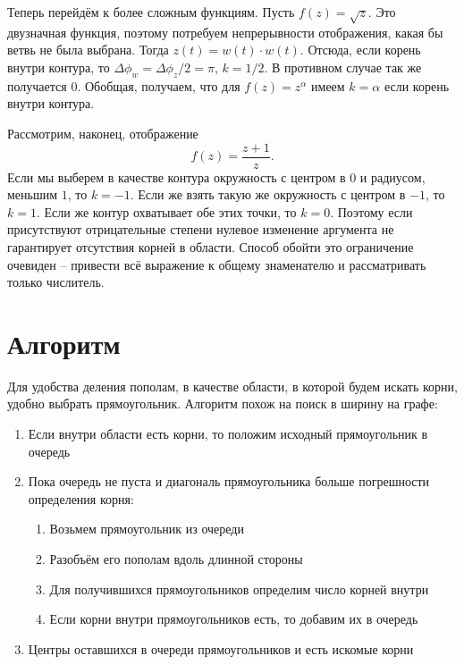 Теперь перейдём к более сложным функциям. Пусть \( f(z) = \sqrt{z} \). Это
двузначная функция, поэтому потребуем непрерывности отображения, какая бы ветвь
не была выбрана. Тогда \( z(t) = w(t)\cdot w(t) \). Отсюда, если корень внутри
контура, то \( \Delta\phi_w = \Delta\phi_z / 2 = \pi \), \( k = 1/2 \). В
противном случае так же получается \(0\). Обобщая, получаем, что для \( f(z) =
z^\alpha \) имеем \( k = \alpha \) если корень внутри контура.

Рассмотрим, наконец, отображение
\[
    f(z) = \frac{z+1}{z}.
\]
Если мы выберем в качестве контура окружность с центром в \(0\) и радиусом,
меньшим \(1\), то \(k = -1\). Если же взять такую же окружность с центром
в \(-1\), то \(k = 1\). Если же контур охватывает обе этих точки, то
\(k = 0\). Поэтому если присутствуют отрицательные степени нулевое изменение
аргумента не гарантирует отсутствия корней в области. Способ обойти это
ограничение очевиден -- привести всё выражение к общему знаменателю и
рассматривать только числитель.

\section{Алгоритм}
Для удобства деления пополам, в качестве области, в которой будем искать корни, удобно выбрать прямоугольник. Алгоритм похож на поиск в ширину на графе:

\begin{enumerate}
    \item Если внутри области есть корни, то положим исходный прямоугольник в очередь
    \item Пока очередь не пуста и диагональ прямоугольника больше погрешности определения корня:
    \begin{enumerate}
        \item Возьмем прямоугольник из очереди
        \item Разобъём его пополам вдоль длинной стороны
        \item Для получившихся прямоугольников определим число корней внутри
        \item Если корни внутри прямоугольников есть, то добавим их в очередь
    \end{enumerate}
    \item Центры оставшихся в очереди прямоугольников и есть искомые корни
\end{enumerate}

